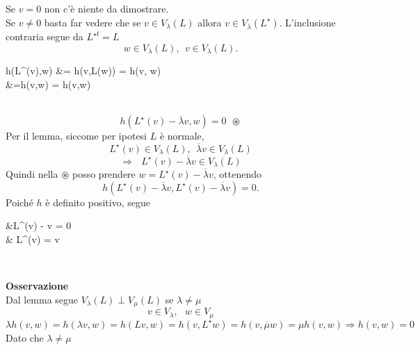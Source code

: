 \documentclass[12px]{article}
\begin{document}
	\begin{dimo}
		Se $v = 0$ non c'è niente da dimostrare.\\
		Se $v \neq 0$ basta far vedere che se $v\in V_ \lambda (L)$ allora $v\in V_{\overline{ \lambda}}(L^\star)$. L'inclusione contraria segue da $L^{\star t} = L$
		 \[
		w\in V_ \lambda (L), \ \ v\in V_ \lambda (L)
		.\] 
		\begin{aligned}
			\hspace{80px}h(L^\star(v),w) &= h(v,L(w)) = h(v, \lambda w)\\
					&=\overline{ \lambda}h(v,w) = h(\overline{ \lambda}v,w)
		\end{aligned}\\
		\[
			h(L^\star(v) - \overline{ \lambda}v,w) = 0 \ \ \circledast
		\] 
		Per il lemma, siccome per ipotesi $L$ è normale, 
		 \[
		L^\star (v)\in V_\lambda (L), \ \ \overline{
		\lambda}v\in V_ \lambda (L)
		\] 
		\[
			\Rightarrow \ \ \ L^\star (v) - \overline{ \lambda} v\in V_ \lambda (L)
		\] 
		Quindi nella $\circledast$ posso prendere $w = L^\star (v) - \overline{ \lambda} v$, ottenendo 
		\[
			h(L^\star (v) - \overline{ \lambda} v, L^\star (v) - \overline{\lambda} v) = 0
		.\] 
		Poiché $h$ è definito positivo, segue\\
		\begin{aligned}
			&L^\star(v) - \overline{ \lambda}v = 0\\
			 \hspace{50px}  & L^\star (v) = \overline{ \lambda} v
		\end{aligned}\\
	\end{dimo}
	\textbf{Osservazione}\\
	Dal lemma segue $V_ \lambda(L) \perp V_\mu (L)$ se $ \lambda \neq \mu$
	\[
	v\in V_ \lambda, \ \ \ w\in V_\mu
	\] 
	\[
		\lambda h(v,w) = h( \lambda v,w) = h(Lv,w) = h(v,L^\star w) = h(v, \overline{\mu}w) = \mu h(v,w) \Rightarrow  h(v,w) = 0
	\]
	Dato che $ \lambda \neq \mu$
\end{document}
